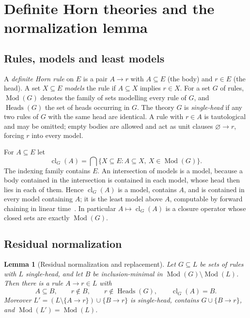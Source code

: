 \documentclass[11pt,a4paper]{article}
\theoremstyle{plain}
\newtheorem{lemma}[theorem]{Lemma}
\theoremstyle{definition}
\theoremstyle{remark}
\newcommand{\Mod}{\operatorname{Mod}}
\newcommand{\cl}{\operatorname{cl}}
\newcommand{\Heads}{\operatorname{Heads}}
\begin{document}
\section{Definite Horn theories and the normalization lemma}\label{sec:horn}

\subsection{Rules, models and least models}

A \emph{definite Horn rule} on $E$ is a pair $A\to r$ with $A\subseteq E$ (the body) and $r\in E$ (the head). A set $X\subseteq E$ \emph{models} the rule if $A\subseteq X$ implies $r\in X$. For a set $G$ of rules, $\Mod(G)$ denotes the family of sets modelling every rule of $G$, and $\Heads(G)$ the set of heads occurring in $G$. The theory $G$ is \emph{single-head} if any two rules of $G$ with the same head are identical. A rule with $r\in A$ is tautological and may be omitted; empty bodies are allowed and act as unit clauses $\varnothing\to r$, forcing $r$ into every model.

For $A\subseteq E$ let
\begin{equation}\label{eq:closure}
 \cl_G(A)=\bigcap\{X\subseteq E: A\subseteq X,\ X\in\Mod(G)\}.
\end{equation}
The indexing family contains $E$. An intersection of models is a model, because a body contained in the intersection is contained in each model, whose head then lies in each of them. Hence $\cl_G(A)$ is a model, contains $A$, and is contained in every model containing $A$; it is the least model above $A$, computable by forward chaining in linear time~\cite{dowling1984linear}. In particular $A\mapsto\cl_G(A)$ is a closure operator whose closed sets are exactly $\Mod(G)$.

\subsection{Residual normalization}

\begin{lemma}[Residual normalization and replacement]\label{lem:normalization}
Let $G\subseteq L$ be sets of rules with $L$ single-head, and let $B$ be inclusion-minimal in $\Mod(G)\setminus\Mod(L)$. Then there is a rule $A\to r\in L$ with
\begin{equation}\label{eq:normal}
 A\subseteq B,\qquad r\notin B,\qquad r\notin\Heads(G),\qquad \cl_G(A)=B .
\end{equation}
Moreover $L'=(L\setminus\{A\to r\})\cup\{B\to r\}$ is single-head, contains $G\cup\{B\to r\}$, and $\Mod(L')=\Mod(L)$.
\end{lemma}
\end{document}
